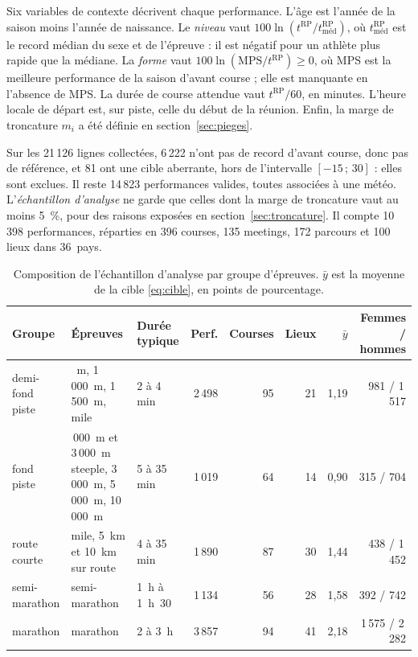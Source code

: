 \documentclass[11pt,a4paper]{article}
\newcommand{\RP}{\mathrm{RP}}
\begin{document}
Six variables de contexte décrivent chaque performance. L'âge est l'année de la saison moins l'année de naissance.
Le \emph{niveau} vaut $100\ln(t^{\RP}/t^{\RP}_{\text{méd}})$, où $t^{\RP}_{\text{méd}}$ est le record médian du
sexe et de l'épreuve : il est négatif pour un athlète plus rapide que la médiane. La \emph{forme} vaut
$100\ln(\text{MPS}/t^{\RP}) \geq 0$, où MPS est la meilleure performance de la saison d'avant course ; elle est
manquante en l'absence de MPS. La durée de course attendue vaut $t^{\RP}/60$, en minutes. L'heure locale de départ
est, sur piste, celle du début de la réunion. Enfin, la marge de troncature $m_i$ a été définie en
section~\ref{sec:pieges}.

Sur les 21\,126 lignes collectées, 6\,222 n'ont pas de record d'avant course, donc pas de référence, et 81 ont une
cible aberrante, hors de l'intervalle $[-15\,;\,30]$ : elles sont exclues. Il reste 14\,823 performances valides,
toutes associées à une météo. L'\emph{échantillon d'analyse} ne garde que celles dont la marge de troncature vaut au
moins 5~\%, pour des raisons exposées en section~\ref{sec:troncature}. Il compte 10\,398 performances, réparties en
396 courses, 135 meetings, 172 parcours et 100 lieux dans 36~pays.

\begin{table}[htbp]
\centering
\small
\caption{Composition de l'échantillon d'analyse par groupe d'épreuves. $\bar y$ est la moyenne de la cible
\eqref{eq:cible}, en points de pourcentage.}
\label{tab:groupes}
\begin{tabular}{@{}l>{\raggedright\arraybackslash}p{4.6cm}lrrrrr@{}}
\toprule
Groupe & Épreuves & Durée typique & Perf. & Courses & Lieux & $\bar y$ & Femmes / hommes \\
\midrule
demi-fond piste & 800~m, 1\,000~m, 1\,500~m, mile & 2 à 4 min & 2\,498 & 95 & 21 & 1,19 & 981 / 1\,517 \\
fond piste & 2\,000~m et 3\,000~m steeple, 3\,000~m, 5\,000~m, 10\,000~m & 5 à 35 min & 1\,019 & 64 & 14 & 0,90 & 315 / 704 \\
route courte & mile, 5~km et 10~km sur route & 4 à 35 min & 1\,890 & 87 & 30 & 1,44 & 438 / 1\,452 \\
semi-marathon & semi-marathon & 1~h à 1~h~30 & 1\,134 & 56 & 28 & 1,58 & 392 / 742 \\
marathon & marathon & 2 à 3~h & 3\,857 & 94 & 41 & 2,18 & 1\,575 / 2\,282 \\
\bottomrule
\end{tabular}
\end{table}
\end{document}
